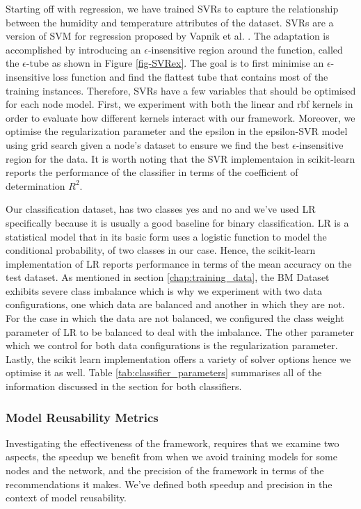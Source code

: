 \documentclass{mpaper}
\begin{document}
Starting off with regression, we have trained SVRs to capture the relationship between the humidity and temperature attributes of the dataset. SVRs are a version of SVM for regression proposed by Vapnik et al. \cite{OriginalSVR}. The adaptation is accomplished by introducing an $\epsilon$-insensitive region around the function, called the $\epsilon$-tube as shown in Figure \ref{fig-SVRex}. The goal is to first minimise an $\epsilon$-insensitive loss function and find the flattest tube that contains most of the training instances. Therefore, SVRs have a few variables that should be optimised for each node model. First, we experiment with both the linear and rbf kernels in order to evaluate how different kernels interact with our framework. Moreover, we optimise the regularization parameter and the epsilon in the epsilon-SVR model using grid search given a node's dataset to ensure we find the best $\epsilon$-insensitive region for the data. It is worth noting that the SVR implementaion in scikit-learn reports the performance of the classifier in terms of the coefficient of determination $R^2$. 

Our classification dataset, has two classes yes and no and we've used LR specifically because it is usually a good baseline for binary classification. LR \cite{OriginalLR} is a statistical model that in its basic form uses a logistic function to model the conditional probability, of two classes in our case. Hence, the scikit-learn implementation of LR reports performance in terms of the mean accuracy on the test dataset. As mentioned in section \ref{chap:training_data}, the BM Dataset exhibits severe class imbalance which is why we experiment with two data configurations, one which data are balanced and another in which they are not. For the case in which the data are not balanced, we configured the class weight parameter of LR to be balanced to deal with the imbalance. The other parameter which we control for both data configurations is the regularization parameter. Lastly, the scikit learn implementation offers a variety of solver options hence we optimise it as well. Table \ref{tab:classifier_parameters} summarises all of the information discussed in the section for both classifiers. 

\subsubsection{Model Reusability Metrics}

Investigating the effectiveness of the framework, requires that we examine two aspects, the speedup we benefit from when we avoid training models for some nodes and the network, and the precision of the framework in terms of the recommendations it makes. We've defined both speedup and precision in the context of model reusability.
\end{document}
